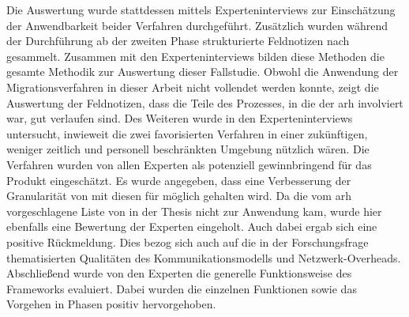 Die Auswertung wurde stattdessen mittels Experteninterviews zur Einschätzung der Anwendbarkeit beider Verfahren durchgeführt.
Zusätzlich wurden während der Durchführung ab der zweiten Phase strukturierte Feldnotizen nach  gesammelt.
Zusammen mit den Experteninterviews bilden diese Methoden die gesamte Methodik zur Auswertung dieser Fallstudie.
Obwohl die Anwendung der Migrationsverfahren in dieser Arbeit nicht vollendet werden konnte, zeigt die Auswertung der Feldnotizen, dass die Teile des Prozesses, in die der \gls{arh} involviert war, gut verlaufen sind.
Des Weiteren wurde in den Experteninterviews untersucht, inwieweit die zwei favorisierten Verfahren in einer zukünftigen, weniger zeitlich und personell beschränkten Umgebung nützlich wären.
Die Verfahren wurden von allen Experten als potenziell gewinnbringend für das Produkt eingeschätzt.
Es wurde angegeben, dass eine Verbesserung der Granularität von \jf mit diesen für möglich gehalten wird.
Da die vom \gls{arh} vorgeschlagene Liste von \bpp in der Thesis nicht zur Anwendung kam, wurde hier ebenfalls eine Bewertung der Experten eingeholt.
Auch dabei ergab sich eine positive Rückmeldung.
Dies bezog sich auch auf die in der Forschungsfrage thematisierten Qualitäten des Kommunikationsmodells und Netzwerk-Overheads.
Abschließend wurde von den Experten die generelle Funktionsweise des Frameworks evaluiert. 
Dabei wurden die einzelnen Funktionen sowie das Vorgehen in Phasen positiv hervorgehoben.
%

